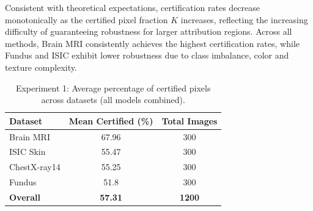 \documentclass[11pt]{article}
\begin{document}
\begin{table}[h!]
\centering
\caption{Experiment 1: Average certification accuracy (\%) across datasets and models for different top-$K$ certified pixel fractions.}
\label{tab:exp1_cert}
\end{table}
Consistent with theoretical expectations, certification rates decrease monotonically as the certified pixel fraction $K$ increases, reflecting the increasing difficulty of guaranteeing robustness for larger attribution regions. Across all methods, Brain MRI consistently achieves the highest certification rates, while Fundus and ISIC exhibit lower robustness due to class imbalance, color and texture complexity. 


\begin{table}[h!]
\centering
\caption{Experiment 1: Average percentage of certified pixels across datasets (all models combined).}
\label{tab:exp1_dataset_avg}
\begin{tabular}{lcc}
\toprule
\textbf{Dataset} & \textbf{Mean Certified (\%)} & \textbf{Total Images} \\
\midrule
Brain MRI   & 67.96 & 300 \\
ISIC Skin  & 55.47 & 300 \\
ChestX-ray14 & 55.25 & 300 \\
Fundus     & 51.8 & 300 \\
\midrule
\textbf{Overall} & \textbf{57.31} & \textbf{1200} \\
\bottomrule
\end{tabular}
\end{table}
\end{document}
